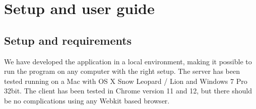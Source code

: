 \section{Setup and user guide}
\label{sec:setup_and_use}

\subsection{Setup and requirements}
We have developed the application in a local environment, making it possible to run the program on any computer with the right setup. The server has been tested running on a Mac with OS X Snow Leopard / Lion and Windows 7 Pro 32bit. The client has been tested in Chrome version 11 and 12, but there should be no complications using any Webkit based browser. 